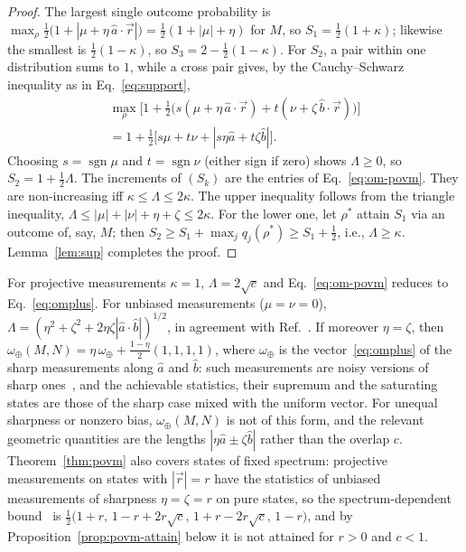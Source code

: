 \documentclass[aps,pra,twocolumn,superscriptaddress,nofootinbib,floatfix]{revtex4-2}
\theoremstyle{definition}
\newcommand{\vecr}{\vec r}
\newcommand{\omplus}{\omega_{\oplus}}
\newcommand{\sqc}{\sqrt{c}}
\begin{document}
\begin{proof}
The largest single outcome probability is
$\max_\rho\frac12\bigl(1+|\mu+\eta\,\hat a\cdot\vecr|\bigr)=\frac12(1+|\mu|+\eta)$ for $M$,
so $S_1=\frac12(1+\kappa)$; likewise the smallest is $\frac12(1-\kappa)$, so
$S_3=2-\frac12(1-\kappa)$. For $S_2$, a pair within one distribution sums to $1$,
while a cross pair gives, by the Cauchy--Schwarz inequality as in
Eq.~\eqref{eq:support},
\begin{multline}
  \max_\rho\bigl[1+\tfrac12\bigl(s(\mu+\eta\,\hat a\cdot\vecr)+t(\nu+\zeta\,\hat b\cdot\vecr)\bigr)\bigr]\\
  =1+\tfrac12\bigl[s\mu+t\nu+|s\eta\hat a+t\zeta\hat b|\bigr].
\end{multline}
Choosing $s=\operatorname{sgn}\mu$ and $t=\operatorname{sgn}\nu$ (either sign if
zero) shows $\Lambda\ge0$,
so $S_2=1+\frac12\Lambda$. The increments of $(S_k)$ are the entries of
Eq.~\eqref{eq:om-povm}. They are non-increasing iff $\kappa\le\Lambda\le2\kappa$.
The upper inequality follows from the triangle inequality,
$\Lambda\le|\mu|+|\nu|+\eta+\zeta\le2\kappa$. For the lower one, let $\rho^\ast$
attain $S_1$ via an outcome of, say, $M$; then
$S_2\ge S_1+\max_jq_j(\rho^\ast)\ge S_1+\frac12$, i.e., $\Lambda\ge\kappa$.
Lemma~\ref{lem:sup} completes the proof.
\end{proof}

For projective measurements $\kappa=1$, $\Lambda=2\sqc$ and
Eq.~\eqref{eq:om-povm} reduces to Eq.~\eqref{eq:omplus}. For unbiased
measurements ($\mu=\nu=0$),
$\Lambda=(\eta^2+\zeta^2+2\eta\zeta|\hat a\cdot\hat b|)^{1/2}$, in agreement with
Ref.~\cite{Baek2019}. If moreover $\eta=\zeta$, then
$\omplus(M,N)=\eta\,\omplus+\frac{1-\eta}{2}(1,1,1,1)$, where $\omplus$ is the
vector~\eqref{eq:omplus} of the sharp measurements along $\hat a$ and $\hat b$:
such measurements are noisy versions of sharp ones~\cite{Busch1986,Baek2019}, and
the achievable statistics, their supremum and the saturating states are those of
the sharp case mixed with the uniform vector. For unequal sharpness or nonzero
bias, $\omplus(M,N)$ is not of this form, and the relevant geometric quantities
are the lengths $|\eta\hat a\pm\zeta\hat b|$ rather than the overlap $c$.
Theorem~\ref{thm:povm} also covers states of fixed spectrum: projective
measurements on states with $|\vecr|=r$ have the statistics of unbiased
measurements of sharpness $\eta=\zeta=r$ on pure states, so the
spectrum-dependent bound~\cite{LiQiao2019,Puchala2018} is
$\frac12\bigl(1+r,\,1-r+2r\sqc,\,1+r-2r\sqc,\,1-r\bigr)$, and by
Proposition~\ref{prop:povm-attain} below it is not attained for $r>0$ and
$c<1$.
\end{document}
